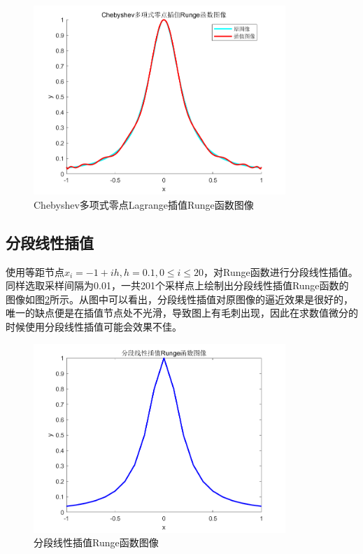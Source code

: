\documentclass[a4paper]{article}
\begin{document}
\begin{figure}[!h]
	\centering
	\includegraphics[width=0.85\textwidth]{../code/result/lagche}
	\caption{\label{fig:7}Chebyshev多项式零点Lagrange插值Runge函数图像}
\end{figure}

\subsection{分段线性插值}
使用等距节点$x_i=-1+ih,h=0.1,0\le i\le 20$，对Runge函数进行分段线性插值。同样选取采样间隔为0.01，一共201个采样点上绘制出分段线性插值Runge函数的图像如图\ref{fig:8}所示。从图中可以看出，分段线性插值对原图像的逼近效果是很好的，唯一的缺点便是在插值节点处不光滑，导致图上有毛刺出现，因此在求数值微分的时候使用分段线性插值可能会效果不佳。

\begin{figure}[!h]
	\centering
	\includegraphics[width=0.85\textwidth]{../code/result/linrunge}
	\caption{\label{fig:8}分段线性插值Runge函数图像}
\end{figure}
\end{document}
